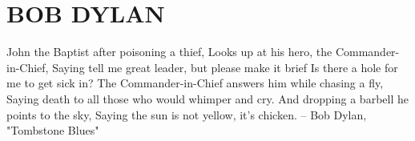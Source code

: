 \chapter{\texorpdfstring{BOB DYLAN}{}} %
\setcounter{equation}{0} 

John the Baptist after poisoning a thief,
Looks up at his hero, the Commander-in-Chief,
Saying tell me great leader, but please make it brief
Is there a hole for me to get sick in?
 The Commander-in-Chief answers him while chasing a fly,
Saying death to all those who would whimper and cry.
And dropping a barbell he points to the sky,
Saying the sun is not yellow, it's chicken.
		-- Bob Dylan, "Tombstone Blues"

